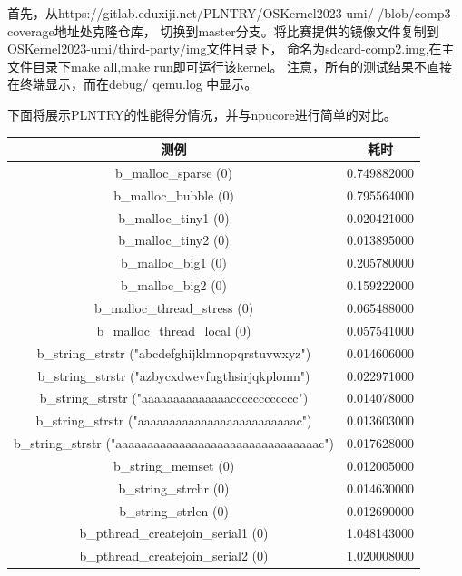 首先，从https://gitlab.eduxiji.net/PLNTRY/OSKernel2023-umi/-/blob/comp3-coverage地址处克隆仓库，
切换到master分支。将比赛提供的镜像文件复制到OSKernel2023-umi/third-party/img文件目录下，
命名为sdcard-comp2.img,在主文件目录下make all,make run即可运行该kernel。
注意，所有的测试结果不直接在终端显示，而在debug/ qemu.log 中显示。

下面将展示PLNTRY的性能得分情况，并与npucore进行简单的对比。

\begin{table}
    \centering
    \begin{tabular}{|c|c|}
        \hline
        测例 & 耗时 \\
        \hline
        b\_malloc\_sparse (0) & 0.749882000 \\
        \hline
        b\_malloc\_bubble (0) & 0.795564000 \\
        \hline
        b\_malloc\_tiny1 (0) & 0.020421000 \\
        \hline
        b\_malloc\_tiny2 (0) & 0.013895000 \\
        \hline
        b\_malloc\_big1 (0) & 0.205780000 \\
        \hline
        b\_malloc\_big2 (0) & 0.159222000 \\
        \hline
        b\_malloc\_thread\_stress (0) & 0.065488000 \\
        \hline
        b\_malloc\_thread\_local (0) & 0.057541000 \\
        \hline
        b\_string\_strstr ("abcdefghijklmnopqrstuvwxyz") & 0.014606000 \\
        \hline
        b\_string\_strstr ("azbycxdwevfugthsirjqkplomn") & 0.022971000 \\
        \hline
        b\_string\_strstr ("aaaaaaaaaaaaaacccccccccccc") & 0.014078000 \\
        \hline
        b\_string\_strstr ("aaaaaaaaaaaaaaaaaaaaaaaaac") & 0.013603000 \\
        \hline
        b\_string\_strstr ("aaaaaaaaaaaaaaaaaaaaaaaaaaaaaaaac") & 0.017628000 \\
        \hline
        b\_string\_memset (0) & 0.012005000 \\
        \hline
        b\_string\_strchr (0) & 0.014630000 \\
        \hline
        b\_string\_strlen (0) & 0.012690000 \\
        \hline
        b\_pthread\_createjoin\_serial1 (0) & 1.048143000 \\
        \hline
        b\_pthread\_createjoin\_serial2 (0) & 1.020008000 \\

\end{tabular}
\end{table}

